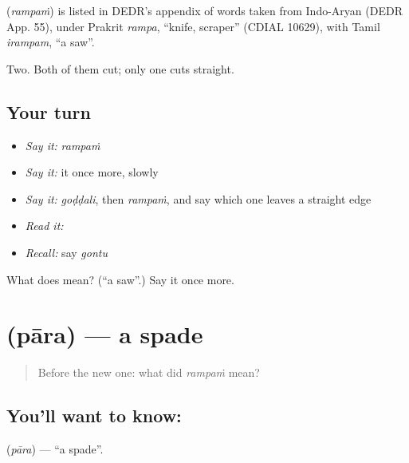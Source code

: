 \begin{cousinweb}
\textbf{} (\emph{rampaṁ}) is listed in DEDR's appendix of words taken from Indo-Aryan (DEDR App. 55), under Prakrit \emph{rampa}, \textquotedblleft{}knife, scraper\textquotedblright{} (CDIAL 10629), with Tamil \emph{irampam}, \textquotedblleft{}a saw\textquotedblright{}.
\end{cousinweb}

\begin{grammarlens}[title={What you've built}]
Two. Both of them cut; only one cuts straight.
\end{grammarlens}

\subsection*{Your turn}
\begin{itemize}
\raggedright
  \item \emph{Say it:} \emph{rampaṁ}
  \item \emph{Say it:} it once more, slowly
  \item \emph{Say it:} \emph{goḍḍali}, then \emph{rampaṁ}, and say which one leaves a straight edge
  \item \emph{Read it:} \textbf{}
  \item \emph{Recall:} say \emph{gontu}
\end{itemize}

\begin{tcolorbox}[breakable,colback=teal!4,colframe=teal!35!black,title={Before you move on}]
What does  mean? (\textquotedblleft{}a saw\textquotedblright{}.) Say it once more.
\end{tcolorbox}
\section[\texorpdfstring{\te{పార} (pāra)}{పార (pāra)}]{ (pāra) — a spade}

\label{lesson:TE-C69-spade}



\begin{quote}
Before the new one: what did \emph{rampaṁ} mean?
\end{quote}

\subsection*{You'll want to know: }
\textbf{} (\emph{pāra}) — \textquotedblleft{}a spade\textquotedblright{}.

